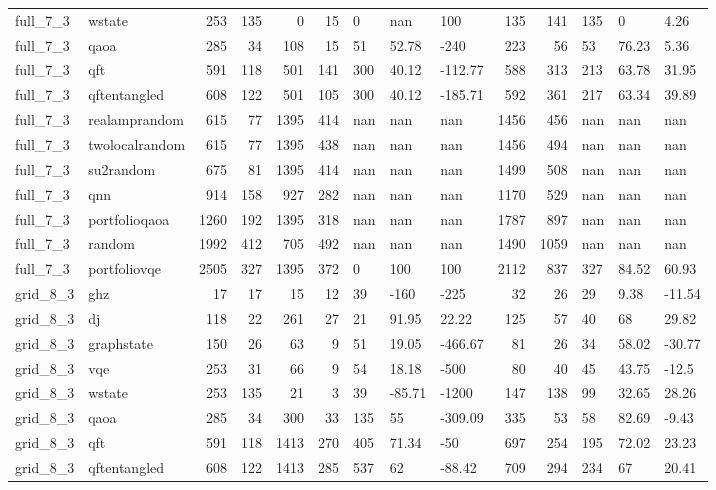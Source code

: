 \begin{longtable}{llrrrrlllrrlll}
full\_7\_3 & wstate & 253 & 135 & 0 & 15 & 0 & nan & 100 & 135 & 141 & 135 & 0 & 4.26 \\
full\_7\_3 & qaoa & 285 & 34 & 108 & 15 & 51 & 52.78 & -240 & 223 & 56 & 53 & 76.23 & 5.36 \\
full\_7\_3 & qft & 591 & 118 & 501 & 141 & 300 & 40.12 & -112.77 & 588 & 313 & 213 & 63.78 & 31.95 \\
full\_7\_3 & qftentangled & 608 & 122 & 501 & 105 & 300 & 40.12 & -185.71 & 592 & 361 & 217 & 63.34 & 39.89 \\
full\_7\_3 & realamprandom & 615 & 77 & 1395 & 414 & nan & nan & nan & 1456 & 456 & nan & nan & nan \\
full\_7\_3 & twolocalrandom & 615 & 77 & 1395 & 438 & nan & nan & nan & 1456 & 494 & nan & nan & nan \\
full\_7\_3 & su2random & 675 & 81 & 1395 & 414 & nan & nan & nan & 1499 & 508 & nan & nan & nan \\
full\_7\_3 & qnn & 914 & 158 & 927 & 282 & nan & nan & nan & 1170 & 529 & nan & nan & nan \\
full\_7\_3 & portfolioqaoa & 1260 & 192 & 1395 & 318 & nan & nan & nan & 1787 & 897 & nan & nan & nan \\
full\_7\_3 & random & 1992 & 412 & 705 & 492 & nan & nan & nan & 1490 & 1059 & nan & nan & nan \\
full\_7\_3 & portfoliovqe & 2505 & 327 & 1395 & 372 & 0 & 100 & 100 & 2112 & 837 & 327 & 84.52 & 60.93 \\
grid\_8\_3 & ghz & 17 & 17 & 15 & 12 & 39 & -160 & -225 & 32 & 26 & 29 & 9.38 & -11.54 \\
grid\_8\_3 & dj & 118 & 22 & 261 & 27 & 21 & 91.95 & 22.22 & 125 & 57 & 40 & 68 & 29.82 \\
grid\_8\_3 & graphstate & 150 & 26 & 63 & 9 & 51 & 19.05 & -466.67 & 81 & 26 & 34 & 58.02 & -30.77 \\
grid\_8\_3 & vqe & 253 & 31 & 66 & 9 & 54 & 18.18 & -500 & 80 & 40 & 45 & 43.75 & -12.5 \\
grid\_8\_3 & wstate & 253 & 135 & 21 & 3 & 39 & -85.71 & -1200 & 147 & 138 & 99 & 32.65 & 28.26 \\
grid\_8\_3 & qaoa & 285 & 34 & 300 & 33 & 135 & 55 & -309.09 & 335 & 53 & 58 & 82.69 & -9.43 \\
grid\_8\_3 & qft & 591 & 118 & 1413 & 270 & 405 & 71.34 & -50 & 697 & 254 & 195 & 72.02 & 23.23 \\
grid\_8\_3 & qftentangled & 608 & 122 & 1413 & 285 & 537 & 62 & -88.42 & 709 & 294 & 234 & 67 & 20.41 \\

\end{longtable}
